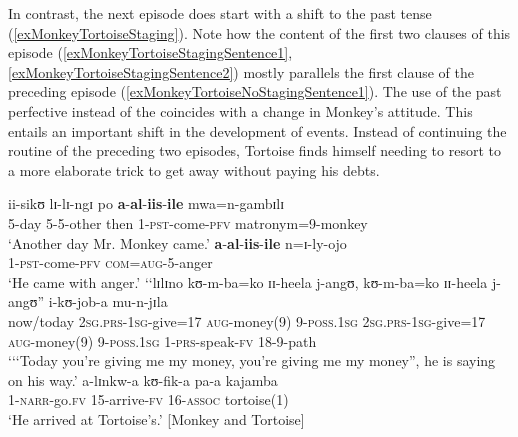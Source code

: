 In contrast, the next episode does start with a shift to the past tense (\ref{exMonkeyTortoiseStaging}). Note how the content of the first two clauses of this episode (\ref{exMonkeyTortoiseStagingSentence1}, \ref{exMonkeyTortoiseStagingSentence2}) mostly parallels the first clause of the preceding episode (\ref{exMonkeyTortoiseNoStagingSentence1}). The use of the past perfective instead of the  coincides with a change in Monkey's attitude. This entails an important shift in the development of events. Instead of continuing the routine of the preceding two episodes, Tortoise finds himself needing to resort to a more elaborate trick to get away without paying his debts.
\begin{exe}
\ex\label{exMonkeyTortoiseStaging} 
\begin{xlist}
\ex \label{exMonkeyTortoiseStagingSentence1} \gll ii-sikʊ lɪ-lɪ-ngɪ po \textbf{a}-\textbf{al}-\textbf{iis}-\textbf{ile} mwa=n-gambɪlɪ\\
5-day 5-5-other then 1-\textsc{pst}-come-\textsc{pfv} matronym=9-monkey\\
\glt \lq Another day Mr. Monkey came.'
\ex \label{exMonkeyTortoiseStagingSentence2} \gll \textbf{a}-\textbf{al}-\textbf{iis}-\textbf{ile} n=ɪ-ly-ojo\\
1-\textsc{pst}-come-\textsc{pfv} \textsc{com}=\textsc{aug}-5-anger\\
\glt \lq He came with anger.'
\ex \gll \textup{\lq\lq}lɪlɪno kʊ-m-ba=ko ɪɪ-heela j-angʊ, kʊ-m-ba=ko ɪɪ-heela j-angʊ\textup{''} i-kʊ-job-a mu-n-jɪla\\
\phantom{\lq\lq}now/today \textsc{2sg.prs}-\textsc{1sg}-give=17 \textsc{aug}-money(9) 9-\textsc{poss.1sg} \textsc{2sg.prs}-\textsc{1sg}-give=17 \textsc{aug}-money(9) 9-\textsc{poss.1sg} 1-\textsc{prs}-speak-\textsc{fv} 18-9-path\\
\glt \lq\lq \lq Today you're giving me my money, you're giving me my money'', he is saying on his way.'
\ex\gll a-lɪnkw-a kʊ-fik-a pa-a kajamba\\
1-\textsc{narr}-go.\textsc{fv} 15-arrive-\textsc{fv} 16-\textsc{assoc} tortoise(1)\\
\glt \lq He arrived at Tortoise's.' [Monkey and Tortoise]
\end{xlist}
\end{exe}

